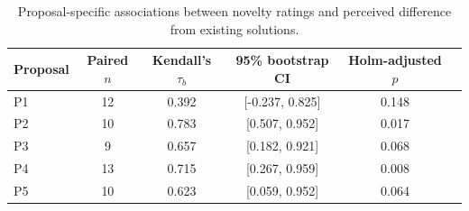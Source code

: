 \begin{table}[htbp]
\caption{Proposal-specific associations between novelty ratings and perceived difference from existing solutions.}
\label{tab:kendall_novelty_difference}
\begin{tabular}{lccccc}
\toprule
Proposal & Paired $n$ & Kendall's $\tau_b$ & 95\% bootstrap CI & Holm-adjusted $p$ \\
\midrule
P1 & 12 & 0.392 & [-0.237, 0.825] & 0.148 \\
P2 & 10 & 0.783 & [0.507, 0.952] & 0.017 \\
P3 & 9 & 0.657 & [0.182, 0.921] & 0.068 \\
P4 & 13 & 0.715 & [0.267, 0.959] & 0.008 \\
P5 & 10 & 0.623 & [0.059, 0.952] & 0.064 \\
\bottomrule
\end{tabular}
\end{table}
